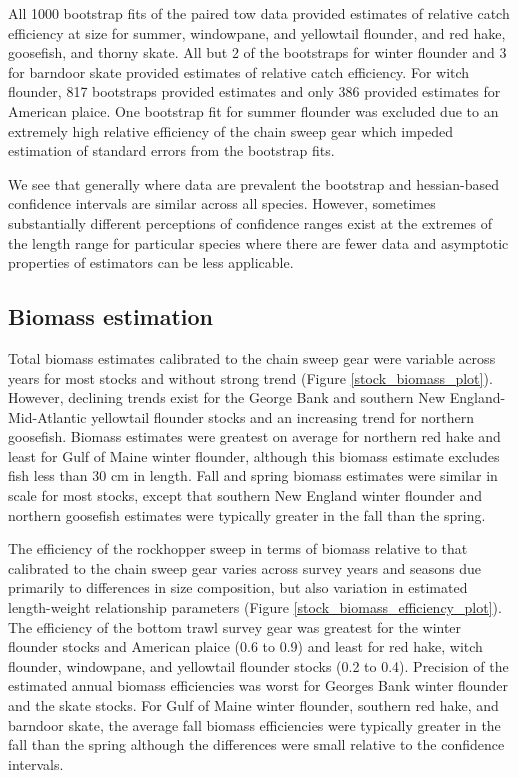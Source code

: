 \documentclass[
  12pt,
]{article}
\begin{document}
All 1000 bootstrap fits of the paired tow data provided estimates of
relative catch efficiency at size for summer, windowpane, and yellowtail
flounder, and red hake, goosefish, and thorny skate. All but 2 of the
bootstraps for winter flounder and 3 for barndoor skate provided
estimates of relative catch efficiency. For witch flounder, 817
bootstraps provided estimates and only 386 provided estimates for
American plaice. One bootstrap fit for summer flounder was excluded due
to an extremely high relative efficiency of the chain sweep gear which
impeded estimation of standard errors from the bootstrap fits.

We see that generally where data are prevalent the bootstrap and
hessian-based confidence intervals are similar across all species.
However, sometimes substantially different perceptions of confidence
ranges exist at the extremes of the length range for particular species
where there are fewer data and asymptotic properties of estimators can
be less applicable.

\hypertarget{biomass-estimation-1}{%
\subsection{Biomass estimation}\label{biomass-estimation-1}}

Total biomass estimates calibrated to the chain sweep gear were variable
across years for most stocks and without strong trend (Figure
\ref{stock_biomass_plot}). However, declining trends exist for the
George Bank and southern New England-Mid-Atlantic yellowtail flounder
stocks and an increasing trend for northern goosefish. Biomass estimates
were greatest on average for northern red hake and least for Gulf of
Maine winter flounder, although this biomass estimate excludes fish less
than 30 cm in length. Fall and spring biomass estimates were similar in
scale for most stocks, except that southern New England winter flounder
and northern goosefish estimates were typically greater in the fall than
the spring.

The efficiency of the rockhopper sweep in terms of biomass relative to
that calibrated to the chain sweep gear varies across survey years and
seasons due primarily to differences in size composition, but also
variation in estimated length-weight relationship parameters (Figure
\ref{stock_biomass_efficiency_plot}). The efficiency of the bottom trawl
survey gear was greatest for the winter flounder stocks and American
plaice (0.6 to 0.9) and least for red hake, witch flounder, windowpane,
and yellowtail flounder stocks (0.2 to 0.4). Precision of the estimated
annual biomass efficiencies was worst for Georges Bank winter flounder
and the skate stocks. For Gulf of Maine winter flounder, southern red
hake, and barndoor skate, the average fall biomass efficiencies were
typically greater in the fall than the spring although the differences
were small relative to the confidence intervals.
\end{document}

